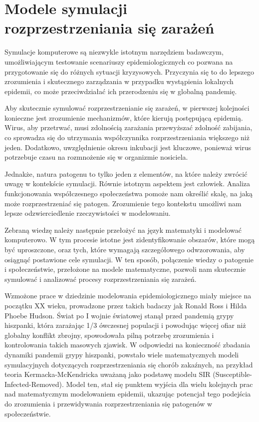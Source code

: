 \chapter{Modele symulacji rozprzestrzeniania się zarażeń}
Symulacje komputerowe są niezwykle istotnym narzędziem badawczym, umożliwiającym testowanie scenariuszy epidemiologicznych co pozwana na przygotowanie się do różnych sytuacji kryzysowych. Przyczynia się to do lepszego zrozumienia i skutecznego zarządzania w przypadku wystąpienia lokalnych epidemii, co może przeciwdziałać ich przerodzeniu się w globalną pandemię.

Aby skutecznie symulować rozprzestrzenianie się zarażeń, w pierwszej kolejności  konieczne jest zrozumienie mechanizmów, które kierują postępującą epidemią. Wirus, aby przetrwać, musi zdolnością zarażania przewyższać zdolność zabijania, co sprowadza się do utrzymania współczynnika rozprzestrzeniania większego niż jeden. Dodatkowo, uwzględnienie okresu inkubacji jest kluczowe, ponieważ wirus potrzebuje czasu na rozmnożenie się w organizmie nosiciela.

Jednakże, natura patogenu to tylko jeden z elementów, na które należy zwrócić uwagę w kontekście symulacji. Równie istotnym aspektem jest człowiek. Analiza funkcjonowania współczesnego społeczeństwa pomoże nam określić skalę, na jaką może rozprzestrzeniać się patogen. Zrozumienie tego kontekstu umożliwi nam lepsze odzwierciedlenie rzeczywistości w modelowaniu.

Zebraną wiedzę należy następnie przełożyć na język matematyki i modelować komputerowo. W tym procesie istotne jest zidentyfikowanie obszarów, które mogą być uproszczone, oraz tych, które wymagają szczegółowego odwzorowania, aby osiągnąć postawione cele symulacji. W ten sposób, połączenie wiedzy o patogenie i społeczeństwie, przełożone na modele matematyczne, pozwoli nam skutecznie symulować i analizować procesy rozprzestrzeniania się zarażeń. 

Wzmożone prace w dziedzinie modelowania epidemiologicznego miały miejsce na początku XX wieku, prowadzone przez takich badaczy jak Ronald Ross\cite{bib:RossRonald} i Hilda Phoebe Hudson\cite{bib:RossHudson}\cite{bib:RossHudson2}. Świat po I wojnie światowej stanął przed pandemią grypy hiszpanki, która zarażając 1/3 ówczesnej populacji i powodując więcej ofiar niż globalny konflikt zbrojny\cite{bib:cdc1918pandemic}, spowodowała pilną potrzebę zrozumienia i kontrolowania takich masowych zjawisk. W odpowiedzi na konieczność zbadania dynamiki pandemii grypy hiszpanki, powstało wiele matematycznych modeli symulacyjnych dotyczących rozprzestrzeniania się chorób zakaźnych, na przykład teoria Kermacka-McKendricka\cite{bib:Kermack} uważaną jako podstawę modelu SIR (Susceptible-Infected-Removed). Model ten, stał się punktem wyjścia dla wielu kolejnych prac nad matematycznym modelowaniem epidemii, ukazując potencjał tego podejścia do zrozumienia i przewidywania rozprzestrzeniania się patogenów w społeczeństwie.

